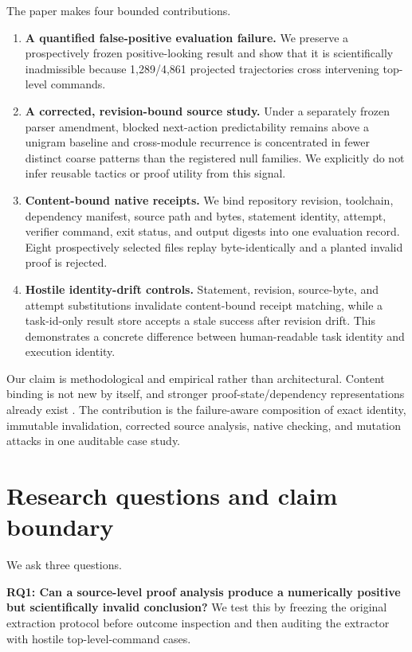 \documentclass[11pt]{article}
\begin{document}
The paper makes four bounded contributions.
\begin{enumerate}[leftmargin=*]
\item \textbf{A quantified false-positive evaluation failure.} We preserve a prospectively frozen positive-looking result and show that it is scientifically inadmissible because 1,289/4,861 projected trajectories cross intervening top-level commands.
\item \textbf{A corrected, revision-bound source study.} Under a separately frozen parser amendment, blocked next-action predictability remains above a unigram baseline and cross-module recurrence is concentrated in fewer distinct coarse patterns than the registered null families. We explicitly do not infer reusable tactics or proof utility from this signal.
\item \textbf{Content-bound native receipts.} We bind repository revision, toolchain, dependency manifest, source path and bytes, statement identity, attempt, verifier command, exit status, and output digests into one evaluation record. Eight prospectively selected files replay byte-identically and a planted invalid proof is rejected.
\item \textbf{Hostile identity-drift controls.} Statement, revision, source-byte, and attempt substitutions invalidate content-bound receipt matching, while a task-id-only result store accepts a stale success after revision drift. This demonstrates a concrete difference between human-readable task identity and execution identity.
\end{enumerate}

Our claim is methodological and empirical rather than architectural. Content binding is not new by itself, and stronger proof-state/dependency representations already exist \cite{yang2023leandojo,xin2025tacminer}. The contribution is the failure-aware composition of exact identity, immutable invalidation, corrected source analysis, native checking, and mutation attacks in one auditable case study.

\section{Research questions and claim boundary}
We ask three questions.

\textbf{RQ1: Can a source-level proof analysis produce a numerically positive but scientifically invalid conclusion?} We test this by freezing the original extraction protocol before outcome inspection and then auditing the extractor with hostile top-level-command cases.
\end{document}

